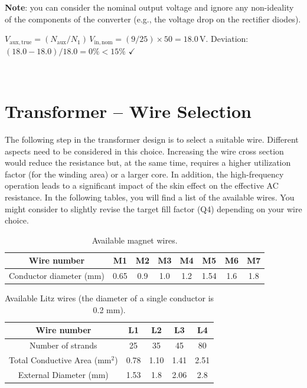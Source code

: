 \documentclass{PELsmallreport}
\begin{document}
\textbf{Note}: you can consider the nominal output voltage and ignore any non-ideality of the components of the converter (e.g., the voltage drop on the rectifier diodes). 

\begin{framed}
$V_\mathrm{aux,true} = (N_\mathrm{aux}/N_1)\,V_\mathrm{in,nom} = (9/25)\times50 = 18.0\,\mathrm{V}$. Deviation: $(18.0-18.0)/18.0 = 0\% < 15\%$ $\checkmark$
\end{framed}

  \hfill{}\\








\newpage
\section{Transformer -- Wire Selection}

The following step in the transformer design is to select a suitable wire.
Different aspects need to be considered in this choice. 
Increasing the wire cross section would reduce the resistance but, at the same time, requires a higher utilization factor (for the winding area) or a larger core. 
In addition, the high-frequency operation leads to a significant impact of the skin effect on the effective AC resistance. 
In the following tables, you will find a list of the available wires. 
You might consider to slightly revise the target fill factor (Q4) depending on your wire choice. 

\begin{table}[H]
\centering
\caption{Available magnet wires.}
\label{tab:availablewiresBare}
\begin{tabular}{cccccccc}
	\toprule
	Wire number & M1 & M2 & M3 & M4 & M5 & M6 & M7 \\
	\midrule
	Conductor diameter ($\mathrm{mm}$) & 0.65 & 0.9 & 1.0 & 1.2 & 1.54 & 1.6 & 1.8 \\
	\bottomrule
\end{tabular}
\end{table}

\begin{table}[H]
\centering
\caption{Available Litz wires (the diameter of a single conductor is 0.2 mm).}
\label{tab:availablewiresLitz}
\begin{tabular}{ccccc}
	\toprule
	Wire number & L1 & L2 & L3 & L4 \\
	\midrule
    Number of strands  & 25 & 35 & 45 & 80 \\
	Total Conductive Area ($\mathrm{mm}^2$)  & 0.78 & 1.10 & 1.41 & 2.51 \\
    External Diameter ($\mathrm{mm}$) & 1.53 & 1.8 & 2.06 & 2.8 \\
	\bottomrule
\end{tabular}
\end{table}
\end{document}
